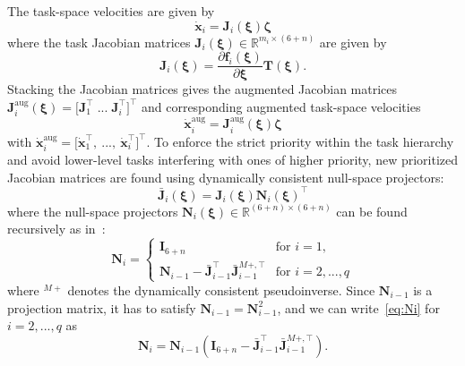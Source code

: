 \documentclass[../main.tex]{subfiles}
\begin{document}
The task-space velocities are given by
\begin{equation}
    \dot{\bm{x}}_i = \bm{J}_i ( \bm{\xi} ) \bm{\zeta}
\end{equation}
where the task Jacobian matrices $\bm{J}_i ( \bm{\xi} ) \in \mathbb{R}^{m_i \times (6+n)}$ are given by
\begin{equation}
    \bm{J}_i ( \bm{\xi} ) = \frac{\partial \bm{f}_i(\bm{\xi})}{\partial \bm{\xi}} \bm{T} ( \bm{\xi} ) .
\end{equation}
Stacking the Jacobian matrices gives the augmented Jacobian matrices $\bm{J}^{\textrm{aug}}_i(\bm{\xi}) = \bigl[ \bm{J}_1^\top \; ... \; \bm{J}_i^\top \bigr]^\top$ and corresponding augmented task-space velocities
\begin{equation}
    \dot{\bm{x}}^{\textrm{aug}}_i = \bm{J}^{\textrm{aug}}_i(\bm{\xi}) \bm{\zeta}
\end{equation}
with $\dot{\bm{x}}^{\textrm{aug}}_i = \bigl[ \dot{\bm{x}}_1^\top,\ ..., \ \dot{\bm{x}}_i^\top \bigr]^\top$.
%
To enforce the strict priority within the task hierarchy and avoid lower-level tasks interfering with ones of higher priority, new prioritized Jacobian matrices are found using dynamically consistent null-space projectors:
\begin{equation}\label{eq:Ji_bar}
    \bar{\bm{J}}_i(\bm{\xi}) = \bm{J}_i(\bm{\xi}) \bm{N}_i(\bm{\xi})^\top
\end{equation}
where the null-space projectors $\bm{N}_i(\bm{\xi}) \in \mathbb{R}^{(6+n) \times (6+n)}$ can be found recursively as in~\cite{Wu2022}: %
\begin{equation}\label{eq:Ni}
    \bm{N}_i = \begin{cases}
        \bm{I}_{6+n} & \textrm{for } i= 1,\\
        \bm{N}_{i-1}  - \bar{\bm{J}}_{i-1}^\top \bar{\bm{J}}_{i-1}^{M+,\top} & \textrm{for } i = 2,...,q
    \end{cases}   
\end{equation}
where $^{M+}$ denotes the dynamically consistent pseudoinverse.
Since $\bm{N}_{i-1}$ is a projection matrix, it has to satisfy $\bm{N}_{i-1} = \bm{N}_{i-1}^2$, and we can write~\eqref{eq:Ni} for $i=2,...,q$ as
\begin{equation}\label{eq:Ni_nested}
    \bm{N}_i = \bm{N}_{i-1} \left( \bm{I}_{6+n} - \bar{\bm{J}}_{i-1}^\top \bar{\bm{J}}_{i-1}^{M+,\top} \right) .
\end{equation}
\end{document}
